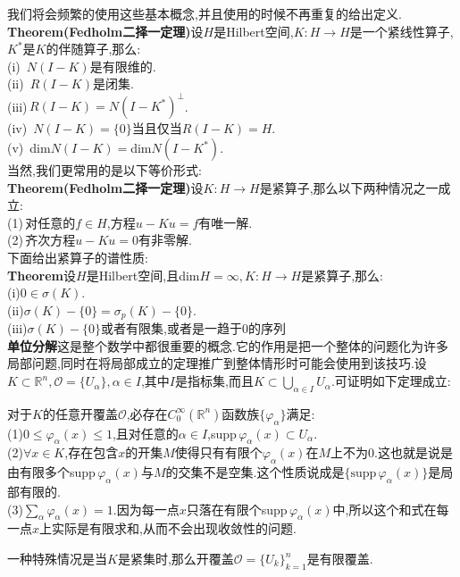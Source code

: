 \documentclass[a4paper,UTF8,12pt]{ctexart}
\begin{document}
我们将会频繁的使用这些基本概念,并且使用的时候不再重复的给出定义.\\
\textbf{Theorem(Fedholm二择一定理)}\quad 设$H$是Hilbert空间,$K:H\to H$是一个紧线性算子,$K^*$是$K$的伴随算子,那么:\\
(i)\, $N(I-K)$是有限维的.\\
(ii)\, $R(I-K)$是闭集.\\
(iii)\,$R(I-K)=N(I-K^*)^{\bot }$.\\
(iv)\, $N(I-K)=\{0\}$当且仅当$R(I-K)=H$.\\
(v)\, dim$N(I-K)=$dim$N(I-K^*)$.\\
当然,我们更常用的是以下等价形式:\\
\textbf{Theorem(Fedholm二择一定理)}\quad 设$K:H\to H$是紧算子,那么以下两种情况之一成立:\\
(1)\,对任意的$f\in H$,方程$u-Ku=f$有唯一解.\\
(2)\,齐次方程$u-Ku=0$有非零解.\\
下面给出紧算子的谱性质:\\
\textbf{Theorem}\quad 设$H$是Hilbert空间,且dim$H=\infty,K:H\to H$是紧算子,那么:\\
(i)$0\in\sigma (K)$.\\
(ii)$\sigma (K)-\{0\}=\sigma_p(K)-\{0\}$.\\
(iii)$\sigma (K)-\{0\}$或者有限集,或者是一趋于0的序列\\
\textbf{单位分解}\quad 这是整个数学中都很重要的概念.它的作用是把一个整体的问题化为许多局部问题,同时在将局部成立的定理推广到整体情形时可能会使用到该技巧.设$K\subset\mathbb{R}^n,\mathcal{O} =\{U_{\alpha}\},\alpha\in I$,其中$I$是指标集,而且$K\subset \bigcup _{\alpha\in I}U_{\alpha}$.可证明如下定理成立:\\
\begin{tcolorbox}[colback=red!5!white,colframe=gray!75!black,title=\textbf{单位分解定理},sharpish corners]
    对于$K$的任意开覆盖$\mathcal{O} $,必存在$C^{\infty}_{0}(\mathbb{R}^n)$函数族$\{\varphi _{\alpha}\}$满足:\\
(1)$0\leqslant\varphi_{\alpha}(x)\leqslant 1$,且对任意的$\alpha\in I$,supp\,$\varphi_{\alpha}(x)\subset U_{\alpha}$.\\
(2)$\forall x\in K$,存在包含$x$的开集$M$使得只有有限个$\varphi_{\alpha}(x)$在$M$上不为$0$.这也就是说是由有限多个supp\,$\varphi_{\alpha}(x)$与$M$的交集不是空集.这个性质说成是$\{\text{supp}\,\varphi_{\alpha}(x)\}$是局部有限的.\\
(3)$\sum_{\alpha}\varphi_{\alpha}(x)=1$.因为每一点$x$只落在有限个supp\,$\varphi_{\alpha}(x)$中,所以这个和式在每一点$x$上实际是有限求和,从而不会出现收敛性的问题.\\
\end{tcolorbox}
一种特殊情况是当$K$是紧集时,那么开覆盖$\mathcal{O}=\{U_k\}^n_{k=1}$是有限覆盖.
\end{document}
